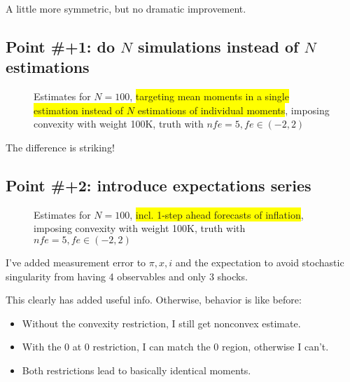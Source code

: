 \documentclass[11pt]{article}
\def \myFigPath {../../figures/}
\renewcommand{\[}{\begin{equation}}
\renewcommand{\]}{\end{equation}}
\def\mySmallerFigScale{0.18}
\def\myTinyFigScale{0.16}
\begin{document}
A little more symmetric, but no dramatic improvement. 


\newpage
\subsection*{Point \#+1: do $N$ simulations instead of $N$ estimations}
\begin{figure}[h!]
\hfill
{}
\caption{Estimates for $N=100$, \colorbox{yellow}{targeting mean moments in a single estimation instead of $N$ estimations of individual moments}, imposing convexity with weight 100K, truth with $nfe=5, fe \in(-2,2)$}
\end{figure}
The difference is striking!

\newpage
\subsection*{Point \#+2: introduce expectations series}
\begin{figure}[h!]
{}
\caption{Estimates for $N=100$, \colorbox{yellow}{incl. 1-step ahead forecasts of inflation}, imposing convexity with weight 100K, truth with $nfe=5, fe \in(-2,2)$}
\end{figure}

I've added measurement error to $\pi,x,i$ and the expectation to avoid stochastic singularity from having 4 observables and only 3 shocks. 

This clearly has added useful info. Otherwise, behavior is like before:
\begin{itemize}
\item Without the convexity restriction, I still get nonconvex estimate.
\item With the 0 at 0 restriction, I can match the 0 region, otherwise I can't.
\item Both restrictions lead to basically identical moments.
\end{itemize}
\end{document}
